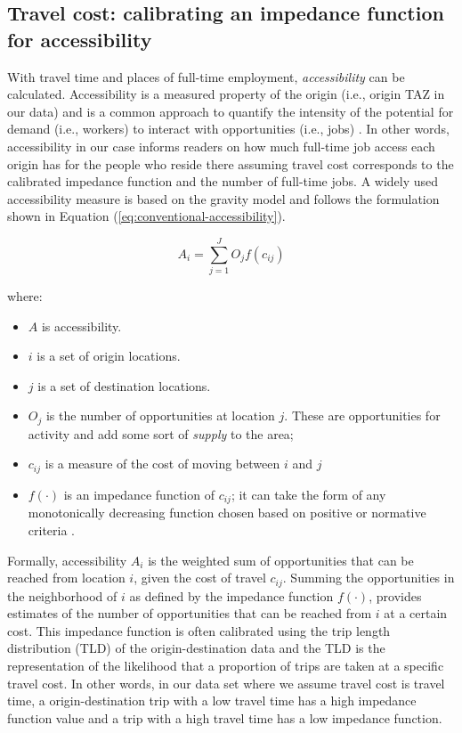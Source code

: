 \documentclass[Royal,times,sageh]{sagej}
\providecommand{\tightlist}{%
  \setlength{\itemsep}{0pt}\setlength{\parskip}{0pt}}
\begin{document}
\hypertarget{travel-cost-calibrating-an-impedance-function-for-accessibility}{%
\subsection{Travel cost: calibrating an impedance function for
accessibility}\label{travel-cost-calibrating-an-impedance-function-for-accessibility}}

With travel time and places of full-time employment,
\emph{accessibility} can be calculated. Accessibility is a measured
property of the origin (i.e., origin TAZ in our data) and is a common
approach to quantify the intensity of the potential for demand (i.e.,
workers) to interact with opportunities (i.e., jobs) . In other words,
accessibility in our case informs readers on how much full-time job
access each origin has for the people who reside there assuming travel
cost corresponds to the calibrated impedance function and the number of
full-time jobs. A widely used accessibility measure is based on the
gravity model and follows the formulation shown in Equation
(\ref{eq:conventional-accessibility}).

\begin{equation}
\label{eq:conventional-accessibility}
A_i = \sum_{j=1}^JO_jf(c_{ij})
\end{equation}

\noindent where:

\begin{itemize}
\tightlist
\item
  \(A\) is accessibility.
\item
  \(i\) is a set of origin locations.
\item
  \(j\) is a set of destination locations.
\item
  \(O_j\) is the number of opportunities at location \(j\). These are
  opportunities for activity and add some sort of \emph{supply} to the
  area;
\item
  \(c_{ij}\) is a measure of the cost of moving between \(i\) and \(j\)
\item
  \(f(\cdot)\) is an impedance function of \(c_{ij}\); it can take the
  form of any monotonically decreasing function chosen based on positive
  or normative criteria \citep{paez2012measuring}.
\end{itemize}

Formally, accessibility \(A_i\) is the weighted sum of opportunities
that can be reached from location \(i\), given the cost of travel
\(c_{ij}\). Summing the opportunities in the neighborhood of \(i\) as
defined by the impedance function \(f(\cdot)\), provides estimates of
the number of opportunities that can be reached from \(i\) at a certain
cost. This impedance function is often calibrated using the trip length
distribution (TLD) of the origin-destination data
\citep{horbachov_theoretical_2018, batista_estimation_2019} and the TLD
is the representation of the likelihood that a proportion of trips are
taken at a specific travel cost. In other words, in our data set where
we assume travel cost is travel time, a origin-destination trip with a
low travel time has a high impedance function value and a trip with a
high travel time has a low impedance function.
\end{document}
